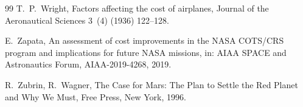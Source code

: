 \documentclass[preprint,12pt]{elsarticle}
\begin{document}
\begin{thebibliography}{99}
T.~P.~Wright,
\newblock Factors affecting the cost of airplanes,
\newblock Journal of the Aeronautical Sciences 3~(4) (1936) 122--128.

E.~Zapata,
\newblock An assessment of cost improvements in the NASA COTS/CRS program and implications for future NASA missions,
\newblock in: AIAA SPACE and Astronautics Forum, AIAA-2019-4268, 2019.

R.~Zubrin, R.~Wagner,
\newblock The Case for Mars: The Plan to Settle the Red Planet and Why We Must,
\newblock Free Press, New York, 1996.

\end{thebibliography}
\end{document}
